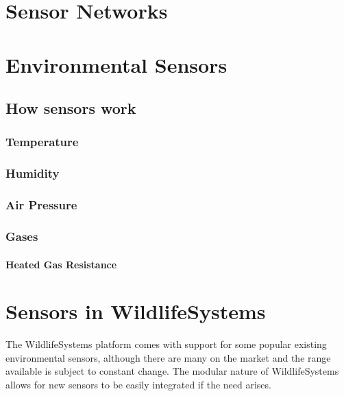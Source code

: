 \documentclass[
]{book}
\begin{document}
\hypertarget{sensor-networks}{%
\chapter{Sensor Networks}\label{sensor-networks}}

\hypertarget{environmental-sensors}{%
\chapter{Environmental Sensors}\label{environmental-sensors}}

\hypertarget{how-sensors-work}{%
\section{How sensors work}\label{how-sensors-work}}

\hypertarget{temperature}{%
\subsection{Temperature}\label{temperature}}

\hypertarget{humidity}{%
\subsection{Humidity}\label{humidity}}

\hypertarget{air-pressure}{%
\subsection{Air Pressure}\label{air-pressure}}

\hypertarget{gases}{%
\subsection{Gases}\label{gases}}

\hypertarget{heated-gas-resistance}{%
\subsubsection{Heated Gas Resistance}\label{heated-gas-resistance}}

\hypertarget{sensors-in-wildlifesystems}{%
\chapter{Sensors in WildlifeSystems}\label{sensors-in-wildlifesystems}}

The WildlifeSystems platform comes with support for some popular existing environmental sensors, although there are many on the market and the range available is subject to constant change. The modular nature of WildlifeSystems allows for new sensors to be easily integrated if the need arises.
\end{document}
